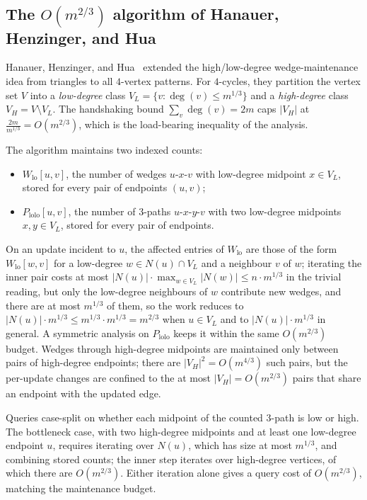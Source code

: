 \documentclass[sigconf,nonacm]{acmart}
\theoremstyle{plain}
\theoremstyle{definition}
\begin{document}
\subsection{The $O(m^{2/3})$ algorithm of Hanauer, Henzinger, and Hua}
\label{sec:related:hhh}
Hanauer, Henzinger, and Hua~\cite{HHH22} extended the
high/low-degree wedge-maintenance idea from triangles to all
$4$-vertex patterns. For $4$-cycles, they partition the vertex set
$V$ into a \emph{low-degree} class
$V_L = \{v : \deg(v) \le m^{1/3}\}$ and a \emph{high-degree}
class $V_H = V \setminus V_L$. The handshaking bound
$\sum_v \deg(v) = 2m$ caps $|V_H|$ at $\frac{2m}{m^{1/3}} = O(m^{2/3})$,
which is the load-bearing inequality of the analysis.

The algorithm maintains two indexed counts:
\begin{itemize}
  \item $W_{\mathrm{lo}}[u, v]$, the number of wedges $u$-$x$-$v$
        with low-degree midpoint $x \in V_L$, stored for every pair
        of endpoints $(u, v)$;
  \item $P_{\mathrm{lolo}}[u, v]$, the number of $3$-paths
        $u$-$x$-$y$-$v$ with two low-degree midpoints
        $x, y \in V_L$, stored for every pair of endpoints.
\end{itemize}
On an update incident to $u$, the affected entries of $W_{\mathrm{lo}}$
are those of the form $W_{\mathrm{lo}}[w, v]$ for a low-degree
$w \in N(u) \cap V_L$ and a neighbour $v$ of $w$; iterating the
inner pair costs at most
$|N(u)| \cdot \max_{w \in V_L} |N(w)| \le n \cdot m^{1/3}$
in the trivial reading, but only the low-degree neighbours of $w$
contribute new wedges, and there are at most $m^{1/3}$ of them, so
the work reduces to
$|N(u)| \cdot m^{1/3} \le m^{1/3} \cdot m^{1/3} = m^{2/3}$ when
$u \in V_L$ and to $|N(u)| \cdot m^{1/3}$ in general. A symmetric
analysis on $P_{\mathrm{lolo}}$ keeps it within the same
$O(m^{2/3})$ budget. Wedges through high-degree midpoints are
maintained only between pairs of high-degree endpoints; there are
$|V_H|^2 = O(m^{4/3})$ such pairs, but the per-update changes are
confined to the at most $|V_H| = O(m^{2/3})$ pairs that share an
endpoint with the updated edge.

Queries case-split on whether each midpoint of the counted
$3$-path is low or high. The bottleneck case, with two high-degree
midpoints and at least one low-degree endpoint $u$, requires
iterating over $N(u)$, which has size at most $m^{1/3}$, and
combining stored counts; the inner step iterates over high-degree
vertices, of which there are $O(m^{2/3})$. Either iteration alone
gives a query cost of $O(m^{2/3})$, matching the maintenance
budget.
\end{document}
